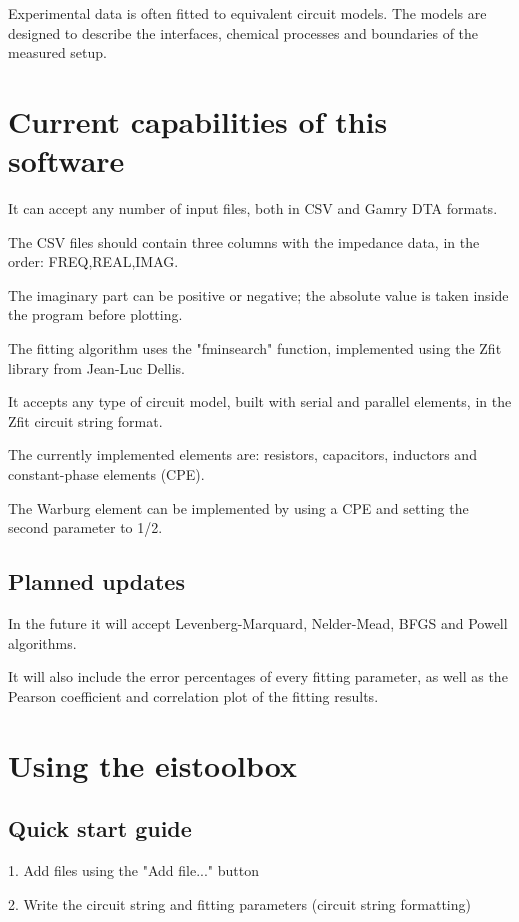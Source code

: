 \documentclass[10pt,a4paper,oneside]{memoir}
\begin{document}
Experimental data is often fitted to equivalent circuit models. The models are designed to describe the interfaces, chemical processes and boundaries of the measured setup.

\chapter{Current capabilities of this software}

It can accept any number of input files, both in CSV and Gamry DTA formats.

The CSV files should contain three columns with the impedance data, in the order: FREQ,REAL,IMAG. 

The imaginary part can be positive or negative; the absolute value is taken inside the program before plotting.

The fitting algorithm uses the "fminsearch" function, implemented using the Zfit library from Jean-Luc Dellis. 

It accepts any type of circuit model, built with serial and parallel elements, in the Zfit circuit string format.

The currently implemented elements are: resistors, capacitors, inductors and constant-phase elements (CPE). 

The Warburg element can be implemented by using a CPE and setting the second parameter to 1/2.


\section{Planned updates}

In the future it will accept Levenberg-Marquard, Nelder-Mead, BFGS and Powell algorithms.

It will also include the error percentages of every fitting parameter, as well as the Pearson coefficient and correlation plot of the fitting results.


\chapter{Using the eistoolbox}

\section{Quick start guide}

1. Add files using the "Add file..." button

2. Write the circuit string and fitting parameters (circuit string formatting)
\end{document}
